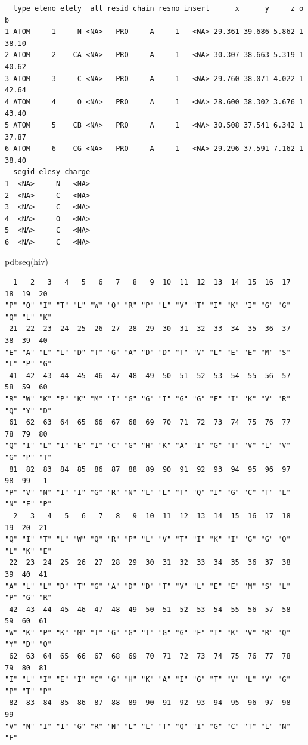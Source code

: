 \documentclass[
  letterpaper,
  DIV=11,
  numbers=noendperiod]{scrartcl}
\newenvironment{Shaded}{\begin{snugshade}}{\end{snugshade}}
\newcommand{\FunctionTok}[1]{\textcolor[rgb]{0.28,0.35,0.67}{#1}}
\newcommand{\NormalTok}[1]{\textcolor[rgb]{0.00,0.23,0.31}{#1}}
\newcommand{\SpecialCharTok}[1]{\textcolor[rgb]{0.37,0.37,0.37}{#1}}
\begin{document}
\begin{Shaded}
\end{Shaded}

\begin{verbatim}
  type eleno elety  alt resid chain resno insert      x      y     z o     b
1 ATOM     1     N <NA>   PRO     A     1   <NA> 29.361 39.686 5.862 1 38.10
2 ATOM     2    CA <NA>   PRO     A     1   <NA> 30.307 38.663 5.319 1 40.62
3 ATOM     3     C <NA>   PRO     A     1   <NA> 29.760 38.071 4.022 1 42.64
4 ATOM     4     O <NA>   PRO     A     1   <NA> 28.600 38.302 3.676 1 43.40
5 ATOM     5    CB <NA>   PRO     A     1   <NA> 30.508 37.541 6.342 1 37.87
6 ATOM     6    CG <NA>   PRO     A     1   <NA> 29.296 37.591 7.162 1 38.40
  segid elesy charge
1  <NA>     N   <NA>
2  <NA>     C   <NA>
3  <NA>     C   <NA>
4  <NA>     O   <NA>
5  <NA>     C   <NA>
6  <NA>     C   <NA>
\end{verbatim}

\begin{Shaded}
\begin{Highlighting}[]
\FunctionTok{pdbseq}\NormalTok{(hiv)}
\end{Highlighting}
\end{Shaded}

\begin{verbatim}
  1   2   3   4   5   6   7   8   9  10  11  12  13  14  15  16  17  18  19  20 
"P" "Q" "I" "T" "L" "W" "Q" "R" "P" "L" "V" "T" "I" "K" "I" "G" "G" "Q" "L" "K" 
 21  22  23  24  25  26  27  28  29  30  31  32  33  34  35  36  37  38  39  40 
"E" "A" "L" "L" "D" "T" "G" "A" "D" "D" "T" "V" "L" "E" "E" "M" "S" "L" "P" "G" 
 41  42  43  44  45  46  47  48  49  50  51  52  53  54  55  56  57  58  59  60 
"R" "W" "K" "P" "K" "M" "I" "G" "G" "I" "G" "G" "F" "I" "K" "V" "R" "Q" "Y" "D" 
 61  62  63  64  65  66  67  68  69  70  71  72  73  74  75  76  77  78  79  80 
"Q" "I" "L" "I" "E" "I" "C" "G" "H" "K" "A" "I" "G" "T" "V" "L" "V" "G" "P" "T" 
 81  82  83  84  85  86  87  88  89  90  91  92  93  94  95  96  97  98  99   1 
"P" "V" "N" "I" "I" "G" "R" "N" "L" "L" "T" "Q" "I" "G" "C" "T" "L" "N" "F" "P" 
  2   3   4   5   6   7   8   9  10  11  12  13  14  15  16  17  18  19  20  21 
"Q" "I" "T" "L" "W" "Q" "R" "P" "L" "V" "T" "I" "K" "I" "G" "G" "Q" "L" "K" "E" 
 22  23  24  25  26  27  28  29  30  31  32  33  34  35  36  37  38  39  40  41 
"A" "L" "L" "D" "T" "G" "A" "D" "D" "T" "V" "L" "E" "E" "M" "S" "L" "P" "G" "R" 
 42  43  44  45  46  47  48  49  50  51  52  53  54  55  56  57  58  59  60  61 
"W" "K" "P" "K" "M" "I" "G" "G" "I" "G" "G" "F" "I" "K" "V" "R" "Q" "Y" "D" "Q" 
 62  63  64  65  66  67  68  69  70  71  72  73  74  75  76  77  78  79  80  81 
"I" "L" "I" "E" "I" "C" "G" "H" "K" "A" "I" "G" "T" "V" "L" "V" "G" "P" "T" "P" 
 82  83  84  85  86  87  88  89  90  91  92  93  94  95  96  97  98  99 
"V" "N" "I" "I" "G" "R" "N" "L" "L" "T" "Q" "I" "G" "C" "T" "L" "N" "F" 
\end{verbatim}
\end{document}
